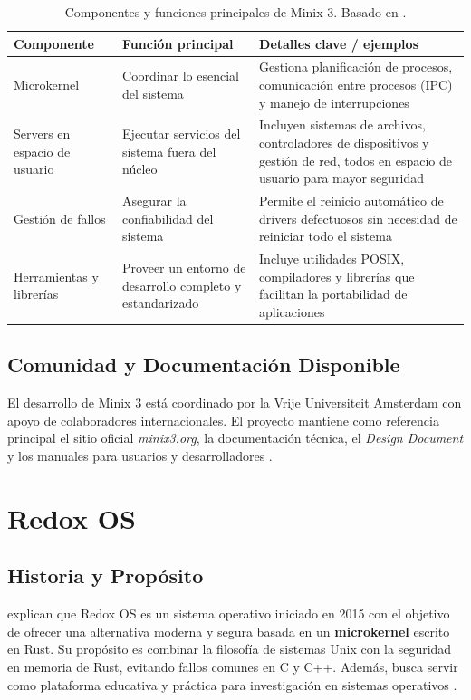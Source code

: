 \begin{table}[H]
\centering
\begin{tabular}{p{3.2cm}p{5cm}p{6cm}}
\hline
\textbf{Componente} & \textbf{Función principal} & \textbf{Detalles clave / ejemplos} \\
\hline
Microkernel & Coordinar lo esencial del sistema & Gestiona planificación de procesos, comunicación entre procesos (IPC) y manejo de interrupciones \\
\hline
Servers en espacio de usuario & Ejecutar servicios del sistema fuera del núcleo & Incluyen sistemas de archivos, controladores de dispositivos y gestión de red, todos en espacio de usuario para mayor seguridad \\
\hline
Gestión de fallos & Asegurar la confiabilidad del sistema & Permite el reinicio automático de drivers defectuosos sin necesidad de reiniciar todo el sistema \\
\hline
Herramientas y librerías & Proveer un entorno de desarrollo completo y estandarizado & Incluye utilidades POSIX, compiladores y librerías que facilitan la portabilidad de aplicaciones \\
\hline
\end{tabular}
\caption[Componentes y funciones clave de Minix 3]{Componentes y funciones principales de Minix 3. Basado en \textcite{minix3-docs}.}
\label{tab:componentes-minix3}
\end{table}


\subsection{Comunidad y Documentación Disponible}
El desarrollo de Minix 3 está coordinado por la Vrije Universiteit Amsterdam con apoyo de colaboradores internacionales.  
El proyecto mantiene como referencia principal el sitio oficial \textit{minix3.org}, la documentación técnica, el \textit{Design Document} y los manuales para usuarios y desarrolladores \parencite{minix3site}.  
 

\section{Redox OS}

\subsection{Historia y Propósito}
\textcite{redox-os} explican que Redox OS es un sistema operativo iniciado en 2015 con el objetivo 
de ofrecer una alternativa moderna y segura basada en un \textbf{microkernel} escrito en Rust.  
Su propósito es combinar la filosofía de sistemas Unix con la seguridad en memoria de Rust, 
evitando fallos comunes en C y C++. Además, busca servir como plataforma educativa y práctica 
para investigación en sistemas operativos \parencite{redox-docs}. 

